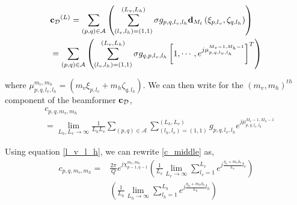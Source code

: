 \begin{align}
     &{{\bf{c}}_{\mathcal{D}}}^{(L)}  =  \sum_{(p,q)\in \mathcal{A}}\left(\sum_{(l_v, l_h)=(1,1)}^{(L_v, L_h)}\sigma g_{p,q, l_v, l_h}\mathbf{d}_{M_t}\left(\xi_{p,l_v}, \zeta_{q,l_h}\right) \right) \nonumber\\
     & = \sum_{(p,q)\in \mathcal{A}}\left(\sum_{(l_v, l_h)=(1,1)}^{(L_v, L_h)}  \sigma g_{q,p,l_v, l_h}\left[1, \cdots,  e^{j\mu_{p,q, l_v, l_h}^{M_v-1, M_h-1}}\right]^T  \right) 
\end{align}

\noindent where $ \mu_{p,q, l_v, l_h}^{m_v, m_h} = \left( m_v\xi_{p,l_v} + m_h\zeta_{q,l_h}\right)$. We can then write for the $(m_v, m_h)^{th}$ component of the beamformer ${\bf{c}}_{\mathcal{D}}$, 
\begin{align}
    &c_{p,q, m_v, m_h} \nonumber\\&=  \lim_{L_h, L_v\rightarrow \infty} \frac{1}{L_hL_v}\sum_{(p,q)\in \mathcal{A}}\sum_{(l_h, l_v)=(1,1)}^{(L_h, L_v)} g_{p,q, l_v, l_h}e^{j\mu_{p,q, l_v, l_h}^{M_v-1, M_h-1}} \label{c_middle}
\end{align}

Using equation \eqref{l_v_l_h}, we can rewrite \eqref{c_middle} as,
\begin{align}
    c_{p,q, m_v, m_h} =&  \frac{2\pi}{Q}e^{j\chi_{p-1, q-1}^{m_v, m_h}}
    \left(\frac{1}{L_v}\lim_{ L_v\rightarrow \infty} \sum_{l_v=1}^{L_v} e^{j\frac{\eta_v+ m_v\delta_v}{L_v} l_v}\right) \nonumber\\&
    \left(\frac{1}{L_h}\lim_{ L_h\rightarrow \infty} \sum_{l_h=1}^{L_h} e^{j\frac{\eta_h+ m_h\delta_h}{L_h} l_h}\right)
\end{align}

